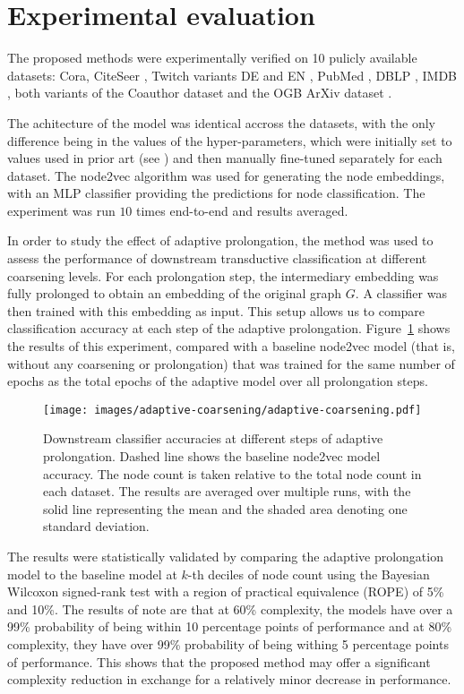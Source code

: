 \section{Experimental evaluation}\label{sec:experimental-evaluation}

The proposed methods were experimentally verified on 10 pulicly available datasets: Cora, CiteSeer \cite{yang_revisiting_2016}, Twitch variants DE and EN \cite{rozemberczki_multi-scale_2021}, PubMed \cite{yang_revisiting_2016}, DBLP \cite{bojchevski_deep_2018}, IMDB \cite{fu_magnn_2020}, both variants of the Coauthor dataset \cite{shchur_pitfalls_2019} and the OGB ArXiv dataset \cite{hu_open_2021}.

The achitecture of the model was identical accross the datasets, with the only difference being in the values of the hyper-parameters, which were initially set to values used in prior art (see \cite{hu_open_2021,fey_fast_2019}) and then manually fine-tuned separately for each dataset. The node2vec algorithm was used for generating the node embeddings, with an MLP classifier providing the predictions for node classification. The experiment was run \( 10 \) times end-to-end and results averaged.

In order to study the effect of adaptive prolongation, the method was used to assess the performance of downstream transductive classification at different coarsening levels. For each prolongation step, the intermediary embedding was fully prolonged to obtain an embedding of the original graph \( G \). A classifier was then trained with this embedding as input. This setup allows us to compare classification accuracy at each step of the adaptive prolongation. Figure~\ref{fig:adaptive-coarsening} shows the results of this experiment, compared with a baseline node2vec model (that is, without any coarsening or prolongation) that was trained for the same number of epochs as the total epochs of the adaptive model over all prolongation steps.

\begin{figure}
  \centering
  \texttt{[image: images/adaptive-coarsening/adaptive-coarsening.pdf]}
  \caption{Downstream classifier accuracies at different steps of adaptive prolongation. Dashed line shows the baseline node2vec model accuracy. The node count is taken relative to the total node count in each dataset. The results are averaged over multiple runs, with the solid line representing the mean and the shaded area denoting one standard deviation.}
  \label{fig:adaptive-coarsening}
\end{figure}

The results were statistically validated by comparing the adaptive prolongation model to the baseline model at \( k \)-th deciles of node count using the Bayesian Wilcoxon signed-rank test \cite{benavoli_bayesian_2014} with a region of practical equivalence (ROPE) of 5\% and 10\%. The results of note are that at 60\% complexity, the models have over a 99\% probability of being within 10 percentage points of performance and at 80\% complexity, they have over 99\% probability of being withing 5 percentage points of performance. This shows that the proposed method may offer a significant complexity reduction in exchange for a relatively minor decrease in performance.
